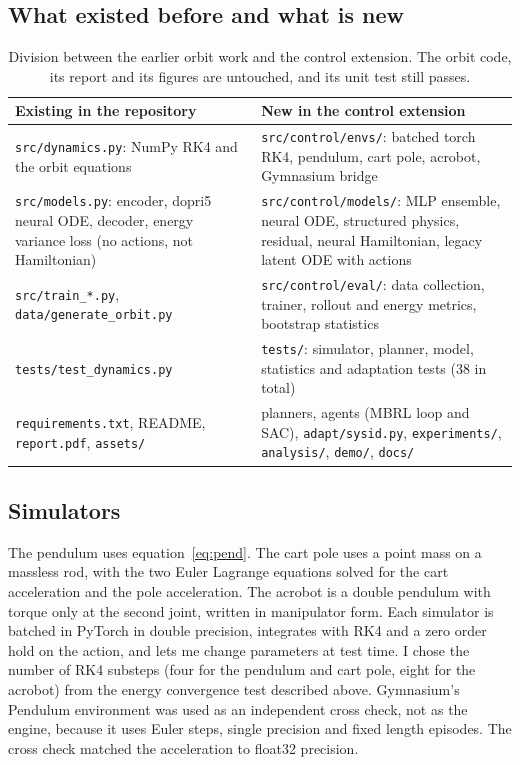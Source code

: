 \documentclass[11pt,a4paper]{article}
\begin{document}
\subsection{What existed before and what is new}
\begin{table}[H]
\centering\small
\begin{tabular}{p{6.2cm}p{8.2cm}}
\toprule
Existing in the repository & New in the control extension \\
\midrule
\texttt{src/dynamics.py}: NumPy RK4 and the orbit equations & \texttt{src/control/envs/}: batched torch RK4, pendulum, cart pole, acrobot, Gymnasium bridge \\
\texttt{src/models.py}: encoder, dopri5 neural ODE, decoder, energy variance loss (no actions, not Hamiltonian) & \texttt{src/control/models/}: MLP ensemble, neural ODE, structured physics, residual, neural Hamiltonian, legacy latent ODE with actions \\
\texttt{src/train\_*.py}, \texttt{data/generate\_orbit.py} & \texttt{src/control/eval/}: data collection, trainer, rollout and energy metrics, bootstrap statistics \\
\texttt{tests/test\_dynamics.py} & \texttt{tests/}: simulator, planner, model, statistics and adaptation tests (38 in total) \\
\texttt{requirements.txt}, README, \texttt{report.pdf}, \texttt{assets/} & planners, agents (MBRL loop and SAC), \texttt{adapt/sysid.py}, \texttt{experiments/}, \texttt{analysis/}, \texttt{demo/}, \texttt{docs/} \\
\bottomrule
\end{tabular}
\caption{Division between the earlier orbit work and the control extension. The orbit code, its report and its figures are untouched, and its unit test still passes.}
\end{table}

\subsection{Simulators}
The pendulum uses equation~\eqref{eq:pend}. The cart pole uses a point mass on a massless rod, with the two Euler Lagrange equations solved for the cart acceleration and the pole acceleration. The acrobot is a double pendulum with torque only at the second joint, written in manipulator form. Each simulator is batched in PyTorch in double precision, integrates with RK4 and a zero order hold on the action, and lets me change parameters at test time. I chose the number of RK4 substeps (four for the pendulum and cart pole, eight for the acrobot) from the energy convergence test described above. Gymnasium's Pendulum environment was used as an independent cross check, not as the engine, because it uses Euler steps, single precision and fixed length episodes. The cross check matched the acceleration to float32 precision.
\end{document}
